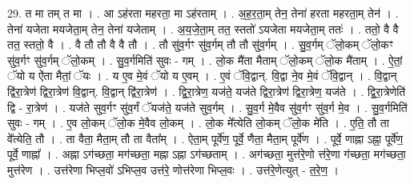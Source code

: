 \documentclass[17pt]{extarticle}
\begin{document}
29. त मा तम् त मा । . आ ऽह॑रता महरता॒ मा ऽह॑रताम् । . अ॒ह॒र॒ता॒म् तेन॒ तेना॑ हरता महरता॒म् तेन॑ । . तेना॑ यजेता मयजेता॒म् तेन॒ तेना॑ यजेताम् । . अ॒य॒जे॒ता॒म् तत॒ स्ततो॑ ऽयजेता मयजेता॒म् ततः॑ । . ततो॒ वै वै तत॒ स्ततो॒ वै । . वै तौ तौ वै वै तौ । . तौ सु॑व॒र्गꣳ सु॑व॒र्गम् तौ तौ सु॑व॒र्गम् । . सु॒व॒र्गम् ॅलो॒कम् ॅलो॒कꣳ सु॑व॒र्गꣳ सु॑व॒र्गम् ॅलो॒कम् । . सु॒व॒र्गमिति॑ सुवः - गम् । . लो॒क मै॑ता मैताम् ॅलो॒कम् ॅलो॒क मै॑ताम् । . ऐ॒तां॒ ॅयो य ऐ॑ता मैतां॒ ॅयः । . य ए॒व मे॒वं ॅयो य ए॒वम् । . ए॒वं ॅवि॒द्वान्. वि॒द्वा ने॒व मे॒वं ॅवि॒द्वान् । . वि॒द्वान् द्वि॑रा॒त्रेण॑ द्विरा॒त्रेण॑ वि॒द्वान्. वि॒द्वान् द्वि॑रा॒त्रेण॑ । . द्वि॒रा॒त्रेण॒ यज॑ते॒ यज॑ते द्विरा॒त्रेण॑ द्विरा॒त्रेण॒ यज॑ते । . द्वि॒रा॒त्रेणेति॑ द्वि - रा॒त्रेण॑ । . यज॑ते सुव॒र्गꣳ सु॑व॒र्गं ॅयज॑ते॒ यज॑ते सुव॒र्गम् । . सु॒व॒र्ग मे॒वैव सु॑व॒र्गꣳ सु॑व॒र्ग मे॒व । . सु॒व॒र्गमिति॑ सुवः - गम् । . ए॒व लो॒कम् ॅलो॒क मे॒वैव लो॒कम् । . लो॒क मे᳚त्येति लो॒कम् ॅलो॒क मे॑ति । . ए॒ति॒ तौ ता वे᳚त्येति॒ तौ । . ता वैता॒ मैता॒म् तौ ता वैता᳚म् । . ऐता॒म् पूर्वे॑ण॒ पूर्वे॒ णैता॒ मैता॒म् पूर्वे॑ण । . पूर्वे॒ णाह्ना ऽह्ना॒ पूर्वे॑ण॒ पूर्वे॒ णाह्ना᳚ । . अह्ना ऽग॑च्छता॒ मग॑च्छता॒ मह्ना ऽह्ना ऽग॑च्छताम् । . अग॑च्छता॒ मुत्त॑रे॒णो त्त॑रे॒णा ग॑च्छता॒ मग॑च्छता॒ मुत्त॑रेण । . उत्त॑रेणा भिप्ल॒वो॑ ऽभिप्ल॒व उत्त॑रे॒ णोत्त॑रेणा भिप्ल॒वः । . उत्त॑रे॒णेत्युत् - त॒रे॒ण॒ । \newline
\end{document}
